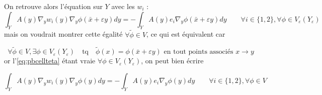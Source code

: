 \documentclass[11pt]{article}
\newcommand{\bx}{\bar{x}}
\newcommand{\tphi}{\tilde{\phi}}
\newcommand{\Ye}{Y_\varepsilon}
\begin{document}
On retrouve alors l'équation sur $Y$ avec les $w_i$ :
\[
    \int_{Y} A(y)\nabla_y w_i(y) \nabla_y \phi(\bx+\varepsilon y) dy =
  - \int_{Y} A(y) e_i \nabla_y \phi(\bx+\varepsilon y) dy \qquad \forall i \in \{1, 2\}, \forall \phi\in V_\varepsilon(\Ye)
\]
mais on voudrait montrer cette égalité $\forall \tphi \in V$, ce qui est équivalent car

\[
  \forall \tphi \in V, \exists \phi \in V_\varepsilon(\Ye) \quad \text{tq} \quad \tphi(x) =
  \phi(\bx+\varepsilon y) \text{ en tout points associés } x \rightarrow y
\]
or l'\autoref{eq:pbcellteta} étant vraie $\forall \phi \in V_\varepsilon(\Ye)$, on peut bien écrire 

\begin{equation}
  \int_{Y} A(y)\nabla_y w_i(y) \nabla_y \phi(y) dy =
  - \int_{Y} A(y) e_i \nabla_y \phi(y) dy \qquad \forall i \in \{1, 2\}, \forall \phi\in V
\end{equation}
\end{document}
